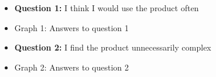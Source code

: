 \documentclass{article}
\begin{document}
\begin{itemize}
		\item[] \textbf{Question 1:} I think I would use the product often
		\item[] \begin{minipage}[t]{\linewidth}
         	 \raggedright
          	\medskip
          	\centerline{Graph 1: Answers to question 1}
          \end{minipage}
\end{itemize}
\newpage
\begin{itemize}
		\item[] \textbf{Question 2:} I find the product unnecessarily complex
		\item[] \begin{minipage}[t]{\linewidth}
         	 \raggedright
          	\medskip
          	\centerline{Graph 2: Answers to question 2}
          \end{minipage}
\end{itemize}
\end{document}

